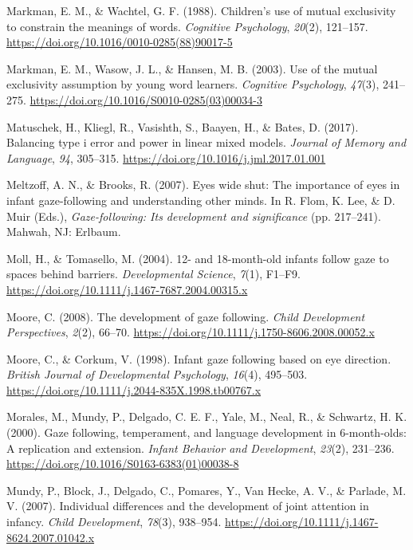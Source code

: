 \documentclass[english,,man,floatsintext]{apa6}
\begin{document}
\leavevmode\hypertarget{ref-Markman_Wachtel_1988}{}%
Markman, E. M., \& Wachtel, G. F. (1988). Children's use of mutual exclusivity to constrain the meanings of words. \emph{Cognitive Psychology}, \emph{20}(2), 121--157. \url{https://doi.org/10.1016/0010-0285(88)90017-5}

\leavevmode\hypertarget{ref-Markman_etal_2003}{}%
Markman, E. M., Wasow, J. L., \& Hansen, M. B. (2003). Use of the mutual exclusivity assumption by young word learners. \emph{Cognitive Psychology}, \emph{47}(3), 241--275. \url{https://doi.org/10.1016/S0010-0285(03)00034-3}

\leavevmode\hypertarget{ref-Matuschek_etal_2017}{}%
Matuschek, H., Kliegl, R., Vasishth, S., Baayen, H., \& Bates, D. (2017). Balancing type i error and power in linear mixed models. \emph{Journal of Memory and Language}, \emph{94}, 305--315. \url{https://doi.org/10.1016/j.jml.2017.01.001}

\leavevmode\hypertarget{ref-Meltzoff_Brooks_2007}{}%
Meltzoff, A. N., \& Brooks, R. (2007). Eyes wide shut: The importance of eyes in infant gaze-following and understanding other minds. In R. Flom, K. Lee, \& D. Muir (Eds.), \emph{Gaze-following: Its development and significance} (pp. 217--241). Mahwah, NJ: Erlbaum.

\leavevmode\hypertarget{ref-Moll_Tomasello_2004}{}%
Moll, H., \& Tomasello, M. (2004). 12- and 18-month-old infants follow gaze to spaces behind barriers. \emph{Developmental Science}, \emph{7}(1), F1--F9. \url{https://doi.org/10.1111/j.1467-7687.2004.00315.x}

\leavevmode\hypertarget{ref-Moore_2008}{}%
Moore, C. (2008). The development of gaze following. \emph{Child Development Perspectives}, \emph{2}(2), 66--70. \url{https://doi.org/10.1111/j.1750-8606.2008.00052.x}

\leavevmode\hypertarget{ref-Moore_Corkum_1998}{}%
Moore, C., \& Corkum, V. (1998). Infant gaze following based on eye direction. \emph{British Journal of Developmental Psychology}, \emph{16}(4), 495--503. \url{https://doi.org/10.1111/j.2044-835X.1998.tb00767.x}

\leavevmode\hypertarget{ref-Morales_etal_2000}{}%
Morales, M., Mundy, P., Delgado, C. E. F., Yale, M., Neal, R., \& Schwartz, H. K. (2000). Gaze following, temperament, and language development in 6-month-olds: A replication and extension. \emph{Infant Behavior and Development}, \emph{23}(2), 231--236. \url{https://doi.org/10.1016/S0163-6383(01)00038-8}

\leavevmode\hypertarget{ref-Mundy_etal_2007}{}%
Mundy, P., Block, J., Delgado, C., Pomares, Y., Van Hecke, A. V., \& Parlade, M. V. (2007). Individual differences and the development of joint attention in infancy. \emph{Child Development}, \emph{78}(3), 938--954. \url{https://doi.org/10.1111/j.1467-8624.2007.01042.x}
\end{document}
